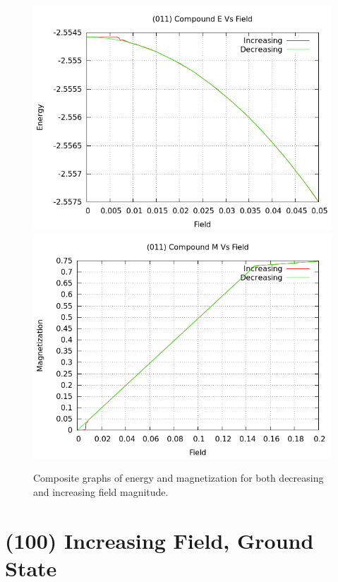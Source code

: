 \documentclass{article}
\begin{document}
\begin{figure}[ht]
\centering
\includegraphics[scale=0.6]{HVariedData/compoundEM/011Ecompound.png}
\includegraphics[scale=0.6]{HVariedData/compoundEM/011Mcompound.png}
\caption{Composite graphs of energy and magnetization for both decreasing and increasing field magnitude.}
\end{figure}
\clearpage
\section{(100) Increasing Field, Ground State}
\end{document}
